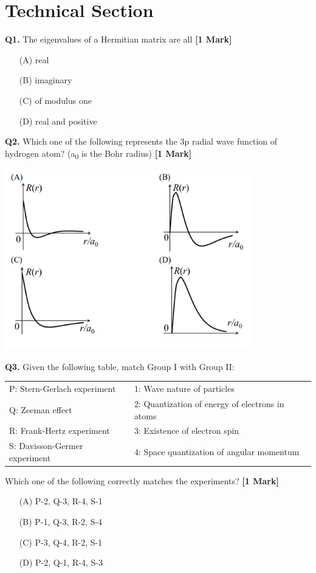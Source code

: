 \documentclass[11pt]{article}
\newcommand{\questiona}[2]{
    \noindent\textbf{Q#2.} #1 \hfill \textbf{[1 Mark]}
}
\begin{document}
\section*{Technical Section}

\questiona{The eigenvalues of a Hermitian matrix are all}{1}
\begin{enumerate}
    \item[(A)] real  
    \item[(B)] imaginary  
    \item[(C)] of modulus one  
    \item[(D)] real and positive  
\end{enumerate}
\vspace{0.5cm}

\questiona{Which one of the following represents the 3p radial wave function of hydrogen atom? (a\textsubscript{0} is the Bohr radius)}{2}
\begin{center}
\includegraphics[width=0.8\textwidth]{figures/2.png}
\end{center}
\vspace{0.5cm}

\questiona{Given the following table, match Group I with Group II: 

\begin{tabular}{ll}
P: Stern-Gerlach experiment & 1: Wave nature of particles \\
Q: Zeeman effect & 2: Quantization of energy of electrons in atoms \\
R: Frank-Hertz experiment & 3: Existence of electron spin \\
S: Davisson-Germer experiment & 4: Space quantization of angular momentum \\
\end{tabular}

Which one of the following correctly matches the experiments?}{3}
\begin{enumerate}
    \item[(A)] P-2, Q-3, R-4, S-1  
    \item[(B)] P-1, Q-3, R-2, S-4  
    \item[(C)] P-3, Q-4, R-2, S-1  
    \item[(D)] P-2, Q-1, R-4, S-3  
\end{enumerate}
\vspace{0.5cm}
\end{document}
